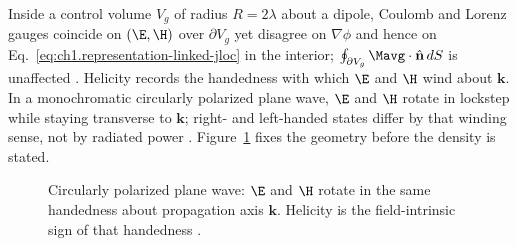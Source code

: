 Inside a control volume $V_g$ of radius $R=2\lambda$ about a dipole, Coulomb and Lorenz gauges coincide on $(\E,\H)$ over $\partial V_g$ yet disagree on $\nabla\phi$ and hence on Eq.~\eqref{eq:ch1.representation-linked-jloc} in the interior; $\oint_{\partial V_g}\Mavg\cdot\hat{\mathbf{n}}\,dS$ is unaffected \cite{belinfante1940,stratton1941}. Helicity records the handedness with which $\E$ and $\H$ wind about $\mathbf{k}$. In a monochromatic circularly polarized plane wave, $\E$ and $\H$ rotate in lockstep while staying transverse to $\mathbf{k}$; right- and left-handed states differ by that winding sense, not by radiated power \cite{stratton1941}. Figure~\ref{fig:ch1.helicity-cp-wave} fixes the geometry before the density is stated.


\begin{figure}[t]
\centering
{}
\caption{Circularly polarized plane wave: $\E$ and $\H$ rotate in the same handedness about propagation axis $\mathbf{k}$. Helicity is the field-intrinsic sign of that handedness \cite{stratton1941,belinfante1940}.}
\label{fig:ch1.helicity-cp-wave}
\end{figure}

